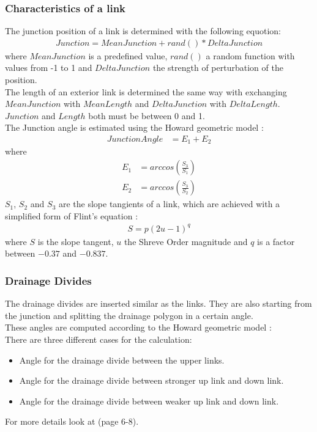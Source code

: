 \documentclass[11pt,a4paper]{article}
\begin{document}
\subsubsection{Characteristics of a link}
The junction position of a link is determined with the following equotion:
\begin{align}
Junction = MeanJunction + rand() * DeltaJunction
\end{align} 
where $MeanJunction$ is a predefined value, $rand()$ a random function with
values from -1 to 1 and $DeltaJunction$ the strength of perturbation of the position.\\
The length of an exterior link is determined the same way with exchanging
$MeanJunction$ with $MeanLength$ and $DeltaJunction$ with $DeltaLength$.\\
$Junction$ and $Length$ both must be between 0 and 1.\\
The Junction angle is estimated using the Howard geometric model
\cite{howard1971optimal}:
\begin{align}
JunctionAngle &= E_1 + E_2
\end{align}
where
\begin{align}
E_1 &= arccos(\frac{S_3}{S_1}) \\
E_2 &= arccos(\frac{S_3}{S_2})
\end{align} 
$S_1$, $S_2$ and $S_3$ are the slope tangients of a link, which are achieved
with a simplified form of Flint's equation \cite{flint1974stream}:
\begin{align}
S = p(2u - 1)^q
\end{align}
where $S$ is the slope tangent, $u$ the Shreve Order magnitude and $q$ is a
factor between $-0.37$ and $-0.837$.
\subsubsection{Drainage Divides}
The drainage divides are inserted similar as the links. They are also starting 
from the junction and splitting the drainage polygon in a certain angle.\\
These angles are computed according to the Howard geometric model \cite{howard1971optimal}:\\
There are three different cases for the calculation:
\begin{itemize}
\item
Angle for the drainage divide between the upper links.
\item
Angle for the drainage divide between stronger up link and down link.
\item
Angle for the drainage divide between weaker up link and down link.
\end{itemize}
For more details look at \cite{howard1971optimal} (page 6-8).
\end{document}
